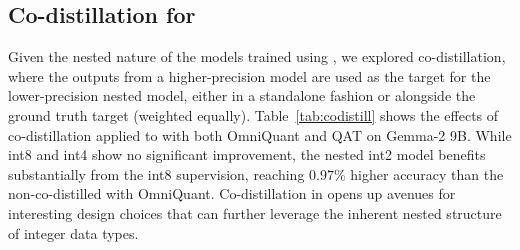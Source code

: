 
\vspace*{-2mm}
\subsection{Co-distillation for  \alg}
\label{sec:abl-codistill}
Given the nested nature of the models trained using \alg, we explored co-distillation, where the outputs from a higher-precision model are used as the target for the lower-precision nested model, either in a standalone fashion or alongside the ground truth target (weighted equally). Table~\ref{tab:codistill} shows the effects of co-distillation applied to \alg with both OmniQuant and QAT on Gemma-2 9B. While int8 and int4 show no significant improvement, the nested int2 model benefits substantially from the int8 supervision, reaching $0.97\%$ higher accuracy than the non-co-distilled \alg with OmniQuant. Co-distillation in \alg opens up avenues for interesting design choices that can further leverage the inherent nested structure of integer data types.



